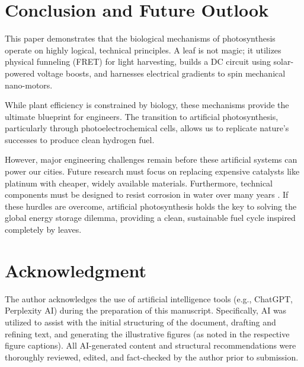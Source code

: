 \documentclass[conference]{IEEEtran}
\begin{document}
\section{Conclusion and Future Outlook}
This paper demonstrates that the biological mechanisms of photosynthesis operate on highly logical, technical principles. A leaf is not magic; it utilizes physical funneling (FRET) for light harvesting, builds a DC circuit using solar-powered voltage boosts, and harnesses electrical gradients to spin mechanical nano-motors. 

While plant efficiency is constrained by biology, these mechanisms provide the ultimate blueprint for engineers. The transition to artificial photosynthesis, particularly through photoelectrochemical cells, allows us to replicate nature's successes to produce clean hydrogen fuel. 

However, major engineering challenges remain before these artificial systems can power our cities. Future research must focus on replacing expensive catalysts like platinum with cheaper, widely available materials. Furthermore, technical components must be designed to resist corrosion in water over many years \cite{lewisResearchOpportunitiesAdvance2016}. If these hurdles are overcome, artificial photosynthesis holds the key to solving the global energy storage dilemma, providing a clean, sustainable fuel cycle inspired completely by leaves.

\section*{Acknowledgment}
The author acknowledges the use of artificial intelligence tools (e.g., ChatGPT, Perplexity AI) during the preparation of this manuscript. Specifically, AI was utilized to assist with the initial structuring of the document, drafting and refining text, and generating the illustrative figures (as noted in the respective figure captions). All AI-generated content and structural recommendations were thoroughly reviewed, edited, and fact-checked by the author prior to submission.


\end{document}

